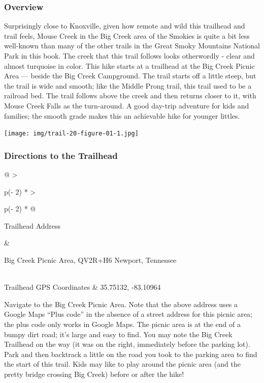 \documentclass[
  letterpaper,
  DIV=11,
  numbers=noendperiod]{scrartcl}
\begin{document}
\hypertarget{overview-21}{%
\subsubsection{Overview}\label{overview-21}}

Surprisingly close to Knoxville, given how remote and wild this
trailhead and trail feels, Mouse Creek in the Big Creek area of the
Smokies is quite a bit less well-known than many of the other trails in
the Great Smoky Mountains National Park in this book. The creek that
this trail follows looks otherwordly - clear and almost turquoise in
color. This hike starts at a trailhead at the Big Creek Picnic Area ---
beside the Big Creek Campground. The trail starts off a little steep,
but the trail is wide and smooth; like the Middle Prong trail, this
trail used to be a railroad bed. The trail follows above the creek and
then returns closer to it, with Mouse Creek Falls as the turn-around. A
good day-trip adventure for kids and families; the smooth grade makes
this an achievable hike for younger littles.

\texttt{[image: img/trail-20-figure-01-1.jpg]}

\hypertarget{directions-to-the-trailhead-21}{%
\subsubsection{Directions to the
Trailhead}\label{directions-to-the-trailhead-21}}

\begin{longtable}[]{@{}
  >{\raggedright\arraybackslash}p{(\columnwidth - 2\tabcolsep) * }
  >{\raggedright\arraybackslash}p{(\columnwidth - 2\tabcolsep) * }@{}}
\toprule\noalign{}
\begin{minipage}[b]{\linewidth}\raggedright
Trailhead Address
\end{minipage} & \begin{minipage}[b]{\linewidth}\raggedright
Big Creek Picnic Area, QV2R+H6 Newport, Tennessee
\end{minipage} \\
\midrule\noalign{}
\endhead
\bottomrule\noalign{}
\endlastfoot
Trailhead GPS Coordinates & 35.75132, -83.10964 \\
\end{longtable}

Navigate to the Big Creek Picnic Area. Note that the above address uses
a Google Maps ``Plus code'' in the absence of a street address for this
picnic area; the plus code only works in Google Maps. The picnic area is
at the end of a bumpy dirt road; it's large and easy to find. You may
note the Big Creek Trailhead on the way (it was on the right,
immediately before the parking lot). Park and then backtrack a little on
the road you took to the parking area to find the start of this trail.
Kids may like to play around the picnic area (and the pretty bridge
crossing Big Creek) before or after the hike!
\end{document}
